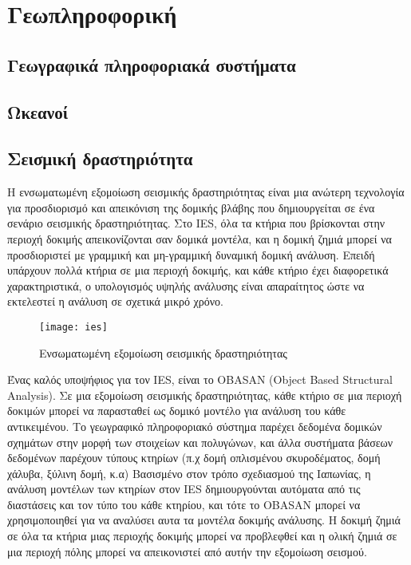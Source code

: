 \section{Γεωπληροφορική}
\subsection{Γεωγραφικά πληροφοριακά συστήματα}



\subsection{Ωκεανοί}

\subsection{Σεισμική δραστηριότητα}
Η ενσωματωμένη εξομοίωση σεισμικής δραστηριότητας είναι μια ανώτερη τεχνολογία για προσδιορισμό και απεικόνιση της δομικής βλάβης που δημιουργείται σε ένα σενάριο σεισμικής δραστηριότητας. Στο IES, όλα τα κτήρια που βρίσκονται στην περιοχή δοκιμής απεικονίζονται σαν δομικά μοντέλα, και η δομική ζημιά μπορεί να προσδιοριστεί με γραμμική και μη-γραμμική δυναμική δομική ανάλυση. Επειδή υπάρχουν πολλά κτήρια σε μια περιοχή δοκιμής, και κάθε κτήριο έχει διαφορετικά χαρακτηριστικά, ο υπολογισμός υψηλής ανάλυσης είναι απαραίτητος ώστε να εκτελεστεί η ανάλυση σε σχετικά μικρό χρόνο.

\begin{figure}[h]
\centering
\texttt{[image: ies]}
\caption{Ενσωματωμένη εξομοίωση σεισμικής δραστηριότητας}
\end{figure}

Ένας καλός υποψήφιος για τον IES, είναι το OBASAN (Object Based Structural Analysis). Σε μια εξομοίωση σεισμικής δραστηριότητας, κάθε κτήριο σε μια περιοχή δοκιμών μπορεί να παρασταθεί ως δομικό μοντέλο για ανάλυση του κάθε αντικειμένου. Το γεωγραφικό πληροφοριακό σύστημα παρέχει δεδομένα δομικών σχημάτων στην μορφή των στοιχείων και πολυγώνων, και άλλα συστήματα βάσεων δεδομένων παρέχουν τύπους κτηρίων (π.χ δομή οπλισμένου σκυροδέματος, δομή χάλυβα, ξύλινη δομή, κ.α) Βασισμένο στον τρόπο σχεδιασμού της Ιαπωνίας, η ανάλυση μοντέλων των κτηρίων στον IES δημιουργούνται αυτόματα από τις διαστάσεις και τον τύπο του κάθε κτηρίου, και τότε το OBASAN μπορεί να χρησιμοποιηθεί για να αναλύσει αυτα τα μοντέλα δοκιμής ανάλυσης. Η δοκιμή ζημιά σε όλα τα κτήρια μιας περιοχής δοκιμής μπορεί να προβλεφθεί και η ολική ζημιά σε μια περιοχή πόλης μπορεί να απεικονιστεί από αυτήν την εξομοίωση σεισμού.

